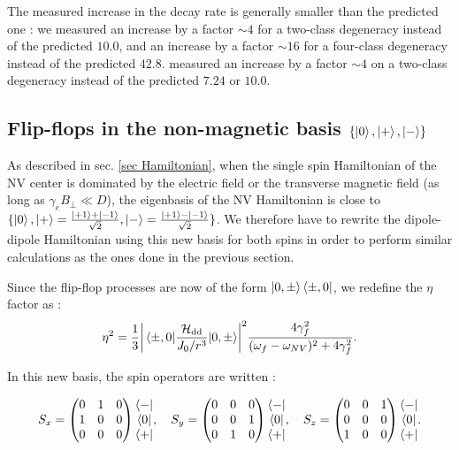 \documentclass[preprintnumbers,amsmath,amssymb,onecolumn,12pt]{revtex4-2}\usepackage{graphicx}%
\begin{document}
The measured increase in the decay rate is generally smaller than the predicted one : we measured an increase by a factor $\sim 4$ for a two-class degeneracy instead of the predicted $10.0$, and an increase by a factor $\sim 16$ for a four-class degeneracy instead of the predicted $42.8$. \cite{choi_depolarization_2017} measured an increase by a factor $\sim 4$ on a two-class degeneracy instead of the predicted $7.24$ or $10.0$.

\subsection{Flip-flops in the non-magnetic basis $\{ \ket{0},\ket{+},\ket{-} \} $}

As described in sec. \ref{sec Hamiltonian}, when the single spin Hamiltonian of the NV center is dominated by the electric field or the transverse magnetic field (as long as $\gamma_e B_\perp \ll D$), the eigenbasis of the NV Hamiltonian is close to $\{\ket{0},\ket{+}=\frac{\ket{+1}+\ket{-1}}{\sqrt{2}},\ket{-}=\frac{\ket{+1}-\ket{-1}}{\sqrt{2}} \} $. We therefore have to rewrite the dipole-dipole Hamiltonian using this new basis for both spins in order to perform similar calculations as the ones done in the previous section.

Since the flip-flop processes are now of the form $\ket{0,\pm}\bra{\pm,0}$, we redefine the $\eta$ factor as :
\begin{equation}
\eta^2=\frac{1}{3} \abs{\mel{\pm ,0}{\frac{\mathcal{H}_{\rm dd}}{J_0/r^3}}{0,\pm }}^2  \frac{4\gamma_f^2}{(\omega_f - \omega_{NV})^2+4\gamma_f^2}.
\end{equation}

In this new basis, the spin operators are written :

\begin{equation}
  S_x = \begin{pmatrix}
  0&1&0 \\
  1&0&0 \\
  0&0&0
  \end{pmatrix}
  \begin{matrix}
  \bra{-} \\
  \bra{0} \\
  \bra{+}
  \end{matrix}  
  , \quad 
 S_y = \begin{pmatrix}
  0&0&0 \\
  0&0&1 \\
  0&1&0
  \end{pmatrix}
  \begin{matrix}
  \bra{-} \\
  \bra{0} \\
  \bra{+}
  \end{matrix}  
 , \quad 
  S_z = \begin{pmatrix}
  0&0&1 \\
  0&0&0\\
  1&0&0
  \end{pmatrix}
  \begin{matrix}
  \bra{-} \\
  \bra{0} \\
  \bra{+}
  \end{matrix}.
  \end{equation}
\end{document}
